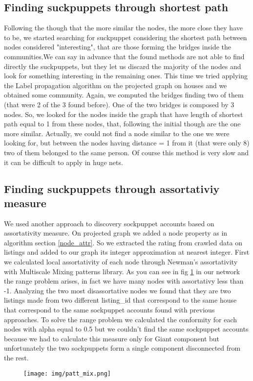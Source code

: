 \documentclass[sigchi]{acmart}
\begin{document}
\subsection{Finding suckpuppets through shortest path}
Following the though that the more similar the nodes, the more close they have to be, we started searching for suckpuppet considering the shortest path between nodes considered "interesting", that are those forming the bridges inside the communities.We can say in advance that the found methods are not able to find directly the suckpuppets, but they let us discard the majority of the nodes and look for something interesting in the remaining ones. This time we tried applying the Label propagation algorithm on the projected graph on houses and we obtained some community. Again, we computed the bridges finding two of them (that were 2 of the 3 found before). One of the two bridges is composed by 3 nodes. So, we looked for the nodes inside the graph that have length of shortest path equal to 1 from these nodes, that, following the initial though are the one more similar. Actually, we could not find a node similar to the one we were looking for, but between the nodes having distance = 1 from it (that were only 8) two of them belonged to the same person. Of course this method is very slow and it can be difficult to apply in huge nets.
 
\subsection{Finding suckpuppets through assortativiy measure}
We used another approach to discovery sockpuppet accounts based on assortativity measure. On projected graph we added a node property as in algorithm section \ref{node_attr}. So we extracted the rating from crawled data on listings and added to our graph its integer approximation at nearest integer. \newline
First we calculated local assortativity of each node through Newman's assortativity \cite{multiscale} with Multiscale Mixing patterns library. As you can see in fig \ref{new} in our network the range problem arises, in fact we have many nodes with assortativy less than -1. \newline
Analyzing the two most disassortative nodes we found that they are two listings made from two different listing\_id that correspond to the same house that correspond to the same sockpuppet accounts found with previous approaches. \newline
To solve the range problem we calculated the conformity for each nodes with alpha equal to 0.5 but we couldn't find the same sockpuppet accounts because we had to calculate this measure only for Giant component but unfortunately the two sockpuppets form a single component disconnected from the rest.
\begin{figure}[h]
  \centering
  \texttt{[image: img/patt\_mix.png]}
  \caption{}
  \label{new}
\end{figure}
\end{document}
